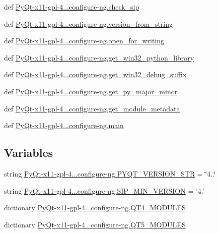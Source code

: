 \begin{DoxyCompactItemize}
def \hyperlink{namespacePyQt-x11-gpl-4_811_82_1_1configure-ng_abae7aaaa05557d85a730d402dbf9f3ef}{Py\+Qt-\/x11-\/gpl-\/4...\+configure-\/ng.\+check\+\_\+sip}
\item 
def \hyperlink{namespacePyQt-x11-gpl-4_811_82_1_1configure-ng_a356ee268f49f589fe4b78748ae5479a6}{Py\+Qt-\/x11-\/gpl-\/4...\+configure-\/ng.\+version\+\_\+from\+\_\+string}
\item 
def \hyperlink{namespacePyQt-x11-gpl-4_811_82_1_1configure-ng_a46bd27a7cfe6c7aec638a70612bb699a}{Py\+Qt-\/x11-\/gpl-\/4...\+configure-\/ng.\+open\+\_\+for\+\_\+writing}
\item 
def \hyperlink{namespacePyQt-x11-gpl-4_811_82_1_1configure-ng_abee80a80441442874441254944d8abed}{Py\+Qt-\/x11-\/gpl-\/4...\+configure-\/ng.\+get\+\_\+win32\+\_\+python\+\_\+library}
\item 
def \hyperlink{namespacePyQt-x11-gpl-4_811_82_1_1configure-ng_a490980f8b69c337ed67ebbbf4b3fb707}{Py\+Qt-\/x11-\/gpl-\/4...\+configure-\/ng.\+get\+\_\+win32\+\_\+debug\+\_\+suffix}
\item 
def \hyperlink{namespacePyQt-x11-gpl-4_811_82_1_1configure-ng_aa4e56d2ed9e3ba98ead880f16c2f424d}{Py\+Qt-\/x11-\/gpl-\/4...\+configure-\/ng.\+get\+\_\+py\+\_\+major\+\_\+minor}
\item 
def \hyperlink{namespacePyQt-x11-gpl-4_811_82_1_1configure-ng_ab0fcd50d5f218f23e6e5f4119672fa30}{Py\+Qt-\/x11-\/gpl-\/4...\+configure-\/ng.\+get\+\_\+module\+\_\+metadata}
\item 
def \hyperlink{namespacePyQt-x11-gpl-4_811_82_1_1configure-ng_a8c5bddfef10b3ebd4468cd7d42346a65}{Py\+Qt-\/x11-\/gpl-\/4...\+configure-\/ng.\+main}
\end{DoxyCompactItemize}
\subsection*{Variables}
\begin{DoxyCompactItemize}
\item 
string \hyperlink{namespacePyQt-x11-gpl-4_811_82_1_1configure-ng_a5f6cf51c973382d31346dffe033b0612}{Py\+Qt-\/x11-\/gpl-\/4...\+configure-\/ng.\+P\+Y\+Q\+T\+\_\+\+V\+E\+R\+S\+I\+O\+N\+\_\+\+S\+T\+R} = \char`\"{}4..\char`\"{}
\item 
string \hyperlink{namespacePyQt-x11-gpl-4_811_82_1_1configure-ng_abbfe52c95b989eca369d9e3f92cb0e30}{Py\+Qt-\/x11-\/gpl-\/4...\+configure-\/ng.\+S\+I\+P\+\_\+\+M\+I\+N\+\_\+\+V\+E\+R\+S\+I\+O\+N} = '4.'
\item 
dictionary \hyperlink{namespacePyQt-x11-gpl-4_811_82_1_1configure-ng_a70e04ef5d5c5da6f18086a217994435c}{Py\+Qt-\/x11-\/gpl-\/4...\+configure-\/ng.\+Q\+T4\+\_\+\+M\+O\+D\+U\+L\+E\+S}
\item 
dictionary \hyperlink{namespacePyQt-x11-gpl-4_811_82_1_1configure-ng_a6bbef627eb3e6031eedc9483a2d5d5c9}{Py\+Qt-\/x11-\/gpl-\/4...\+configure-\/ng.\+Q\+T5\+\_\+\+M\+O\+D\+U\+L\+E\+S}
\end{DoxyCompactItemize}
